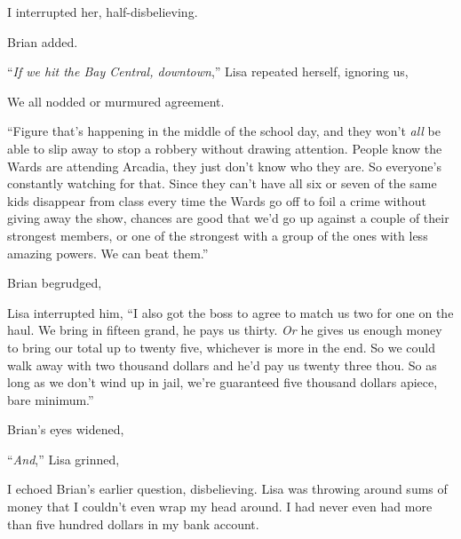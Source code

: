  I interrupted her, half-disbelieving.

 Brian added.

“{\em If we hit the Bay Central, downtown},” Lisa repeated herself, ignoring us, 

We all nodded or murmured agreement.

“Figure that's happening in the middle of the school day, and they won't {\em all} be able to slip away to stop a robbery without drawing attention. People know the Wards are attending Arcadia, they just don't know who they are. So everyone's constantly watching for that. Since they can't have all six or seven of the same kids disappear from class every time the Wards go off to foil a crime without giving away the show, chances are good that we'd go up against a couple of their strongest members, or one of the strongest with a group of the ones with less amazing powers. We can beat them.”

 Brian begrudged, 

Lisa interrupted him, “I also got the boss to agree to match us two for one on the haul. We bring in fifteen grand, he pays us thirty. {\em Or} he gives us enough money to bring our total up to twenty five, whichever is more in the end. So we could walk away with two thousand dollars and he'd pay us twenty three thou. So as long as we don't wind up in jail, we're guaranteed five thousand dollars apiece, bare minimum.”

Brian's eyes widened, 

“{\em And},” Lisa grinned, 

 I echoed Brian's earlier question, disbelieving. Lisa was throwing around sums of money that I couldn't even wrap my head around. I had never even had more than five hundred dollars in my bank account.


